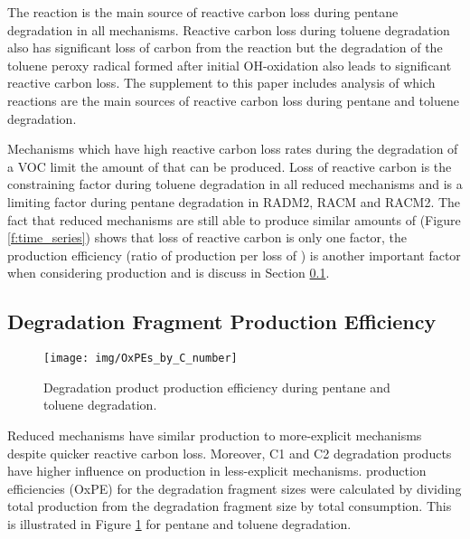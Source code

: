 The  reaction is the main source of reactive carbon loss during pentane degradation in all mechanisms.
Reactive carbon loss during toluene degradation also has significant loss of carbon from the  reaction but the degradation of the toluene peroxy radical formed after initial OH-oxidation also leads to significant reactive carbon loss.
The supplement to this paper includes analysis of which reactions are the main sources of reactive carbon loss during pentane and toluene degradation.

Mechanisms which have high reactive carbon loss rates during the degradation of a VOC limit the amount of  that can be produced.
Loss of reactive carbon is the constraining factor during toluene degradation in all reduced mechanisms and is a limiting factor during pentane degradation in RADM2, RACM and RACM2.
The fact that reduced mechanisms are still able to produce similar amounts of  (Figure \ref{f:time_series}) shows that loss of reactive carbon is only one factor, the  production efficiency (ratio of  production per loss of ) is another important factor when considering  production and is discuss in Section \ref{ss:OxPE}.

\subsection[Degradation Fragment Ox Production Efficiency]{Degradation Fragment  Production Efficiency} \label{ss:OxPE}

\begin{figure}
    \centering
    \texttt{[image: img/OxPEs\_by\_C\_number]}
    \vspace{0mm}
    \caption{Degradation product  production efficiency during pentane and toluene degradation.}
    \vspace{-4mm}
    \label{f:OxPE}
\end{figure}

Reduced mechanisms have similar  production to more-explicit mechanisms despite quicker reactive carbon loss.
Moreover, C1 and C2 degradation products have higher influence on  production in less-explicit mechanisms.
 production efficiencies (OxPE) for the degradation fragment sizes were calculated by dividing total  production from the degradation fragment size by total  consumption.
This is illustrated in Figure \ref{f:OxPE} for pentane and toluene degradation.

